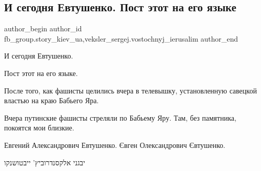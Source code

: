  
 
 
 
 
 
\subsection{И сегодня Евтушенко. Пост этот на его языке}
\label{sec:02_03_2022.fb.fb_group.story_kiev_ua.1.evtushenko_televyshka}
 
\ifcmt
 author_begin
   author_id fb_group.story_kiev_ua,veksler_sergej.vostochnyj_ierusalim
 author_end
\fi

И сегодня Евтушенко.

Пост этот на его языке.

После того, как фашисты целились вчера в телевышку, установленную савецкой
властью на краю Бабьего Яра.

Вчера путинские фашисты стреляли по Бабьему Яру. Там, без памятника, покоятся
мои близкие.


Евгений Александрович Евтушенко. Євген Олександрович Євтушенко.

יבגני אלקסנדרוביץ' ייבטושנקו

